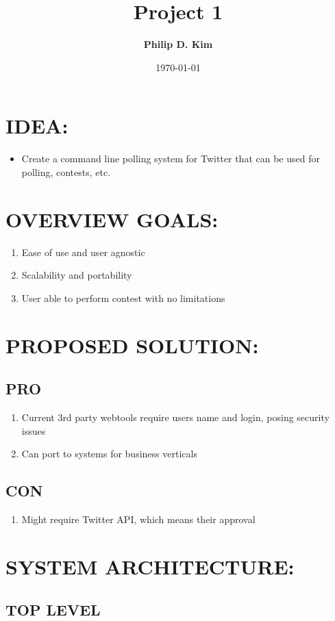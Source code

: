 \documentclass{article}
\title{\Huge\textbf{Project 1}}
\author{\textbf{Philip D. Kim}}
\date{\today}
\begin{document}
  \maketitle
  \section*{\textbf{IDEA:}}
  \begin{itemize}
    \item Create a command line polling system for Twitter that can be used for polling, contests, etc.
  \end{itemize}
  \section*{\textbf{OVERVIEW GOALS:}}
  \begin{enumerate}
    \item Ease of use and user agnostic
    \item Scalability and portability
    \item User able to perform contest with no limitations
  \end{enumerate}
  \section*{\textbf{PROPOSED SOLUTION:}}
  \subsection*{PRO}
  \begin{enumerate}
    \item Current 3rd party webtools require users name and login, posing security issues
    \item Can port to systems for business verticals
  \end{enumerate}
  \subsection*{CON}
  \begin{enumerate}
    \item Might require Twitter API, which means their approval
  \end{enumerate}
  \clearpage
  \section*{\textbf{SYSTEM ARCHITECTURE:}}
  \subsection*{TOP LEVEL}
  \begin{center}
  \end{center}
\end{document}
